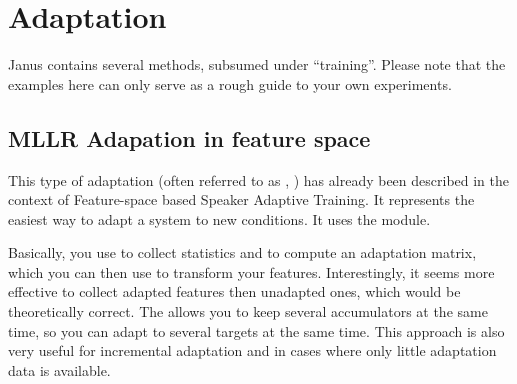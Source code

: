 
\section{Adaptation} \label{janus:adaptation}

Janus contains   several  methods,  subsumed  under
``training''.  Please note that the examples here can  only serve as a
rough guide to your own experiments.

\subsection{MLLR Adapation in feature space} \label{janus:cmllr}


This  type  of  adaptation   (often  referred to  as   ,
) has already    been   described in the    context   of
Feature-space based  Speaker  Adaptive  Training.  It  represents  the
easiest way to    adapt  a system  to new   conditions.  It uses   the
 module.

Basically, you use  to collect statistics and
 to compute an adaptation matrix, which you
can then use to transform your  features. Interestingly, it seems more
effective to collect adapted features then unadapted ones, which would
be theoretically correct. The  allows you to
keep several  accumulators  at the  same  time,  so you  can  adapt to
several targets  at the same time. This  approach  is also very useful
for incremental adaptation  and in cases  where only little adaptation
data is available.

